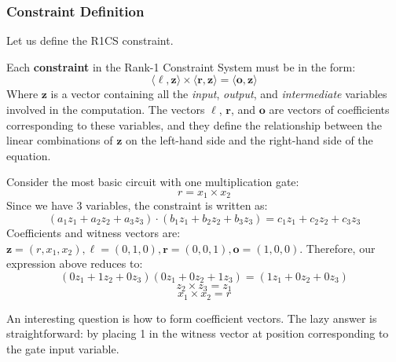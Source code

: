 \documentclass[../lecture-notes-148x210.tex]{subfiles}
\begin{document}
\subsubsection{Constraint Definition}
Let us define the R1CS constraint.

\begin{definition}
    Each \textbf{constraint} in the Rank-1 Constraint System must be in the form:
    \begin{equation*}
        \langle \boldsymbol{\ell}, \mathbf{z}\rangle \times \langle \boldsymbol{r}, \mathbf{z}\rangle = \langle \boldsymbol{o}, \mathbf{z}\rangle
    \end{equation*}
    Where $\mathbf{z}$ is a vector containing all the \textit{input}, \textit{output}, and 
    \textit{intermediate} variables involved in the computation. The vectors $\boldsymbol{\ell}$, 
    $\boldsymbol{r}$, and $\boldsymbol{o}$ are vectors of coefficients corresponding to these variables, 
    and they define the relationship between the linear combinations of $\mathbf{z}$ on the 
    left-hand side and the right-hand side of the equation.
\end{definition}

\begin{example}
    Consider the most basic circuit with one multiplication gate:
    \begin{equation*}
        r = x_1 \times x_2
    \end{equation*}
    Since we have $3$ variables, the constraint is written as:
    \[(a_1z_1 + a_2z_2 + a_3z_3) \cdot (b_1z_1 + b_2z_2 + b_3z_3) = c_1z_1 + c_2z_2 + c_3z_3\]
    Coefficients and witness vectors are:
    $\mathbf{z} = (r, x_1, x_2), \boldsymbol{\ell} = (0, 1, 0), \boldsymbol{r} = (0, 0, 1), \boldsymbol{o} = (1, 0, 0)$. Therefore, our expression above reduces to:
    \[ (0z_1 + 1z_2 + 0z_3)(0z_1 + 0z_2 + 1z_3) = (1z_1 + 0z_2 + 0z_3) \]
    \[ z_2 \times z_3 = z_1 \]
    \[ x_1 \times x_2 = r \]
\end{example}

An interesting question is how to form coefficient vectors. The lazy answer is
straightforward: by placing 1 in the witness vector at position corresponding to
the gate input variable. 

\vspace{-0.5em}
\end{document}
